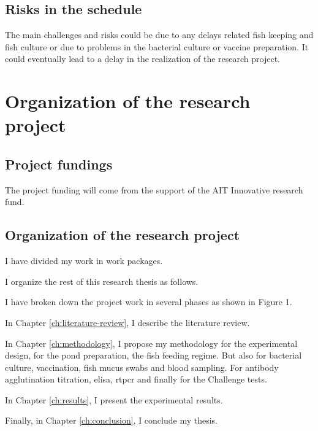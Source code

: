 \subsection{Risks in the schedule}

The main challenges and risks could be due to any delays related fish keeping and fish culture or due to problems in the bacterial culture or vaccine preparation. It could eventually lead to a delay in the realization of the research project.

\section{Organization of the research project}

\subsection{Project fundings}

The project funding will come from the support of the AIT Innovative research fund.

\subsection{Organization of the research project}

I have divided my work in work packages.

I organize the rest of this research thesis as follows.

I have broken down the project work in several phases as shown in Figure 1.

In Chapter \ref{ch:literature-review}, I describe the literature review.

In Chapter \ref{ch:methodology}, I propose my methodology for the experimental design, for the pond preparation, the fish feeding regime. But also for bacterial culture, vaccination, fish mucus swabs and blood sampling. For antibody agglutination titration, \ac{elisa}, \ac{rtpcr} and finally for the Challenge tests. 

In Chapter \ref{ch:results}, I present the experimental results.

Finally, in Chapter \ref{ch:conclusion}, I conclude my thesis.

